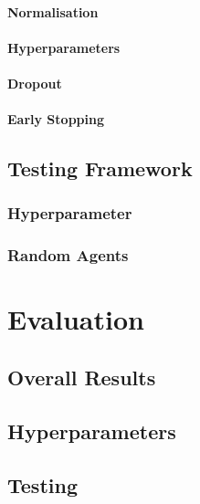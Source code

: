 \documentclass[12pt,a4paper,twoside,openright]{report}
\begin{document}
\subsubsection{Normalisation}

\subsubsection{Hyperparameters}

\subsubsection{Dropout}

\subsubsection{Early Stopping}



\section{Testing Framework}


\subsection{Hyperparameter}

\subsection{Random Agents}


\chapter{Evaluation}

\section{Overall Results}

\section{Hyperparameters}

\section{Testing}
\end{document}

